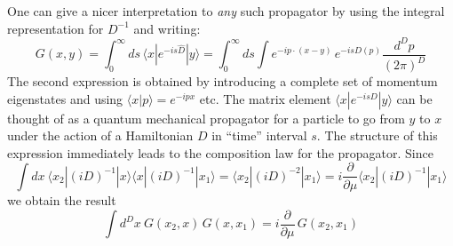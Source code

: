 \documentclass[12pt]{article}
\def\bk#1#2#3{{\langle #1|#2|#3\rangle}}  %
\def\amp#1#2{\langle #1 | #2\rangle}      %
\begin{document}
One can give a nicer interpretation to \textit{any} such propagator by using the integral representation for $D^{-1}$ and writing:
\begin{equation}
 G(x,y)= \int_0^\infty ds \, \bk{x}{e^{-is\hat D}}{y} = \int_0^\infty ds \int e^{-ip\cdot (x-y)} \, e^{-isD(p)} \frac{d^D p}{(2\pi)^D}
 \label{onefourfive}
\end{equation} 
The second expression is obtained by introducing a complete set of momentum eigenstates and using $\amp{x}{p}=e^{-ipx}$ etc. The matrix element $\bk{x}{e^{-isD}}{y}$ can be thought of as a quantum mechanical propagator for a particle to go from $y$ to $x$ under the action of a Hamiltonian $D$ in ``time'' interval $s$. The structure of this expression immediately leads to the composition law for the propagator. Since  
\begin{equation}
 \int dx\ \bk{x_2}{(iD)^{-1}}{x} \bk{x}{(iD)^{-1}}{x_1} =  \bk{x_2}{(iD)^{-2}}{x_1} = i \frac{\partial}{\partial \mu } \bk{x_2}{(iD)^{-1}}{x_1}
\end{equation} 
we obtain the result 
\begin{equation}
 \int d^D x\ G(x_2,x) \, G(x, x_1) = i \frac{\partial}{\partial \mu }\,  G(x_2,x_1)
\end{equation} 
\end{document}
